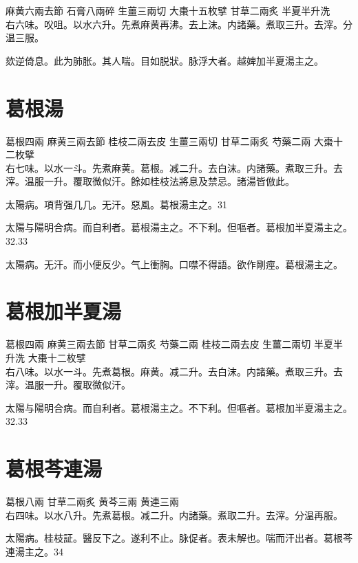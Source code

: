 麻黄{\scriptsize 六兩去節} 石膏{\scriptsize 八兩碎} 生薑{\scriptsize 三兩切} 大棗{\scriptsize 十五枚擘} 甘草{\scriptsize 二兩炙} 半夏{\scriptsize 半升洗}\\
右六味。㕮咀。以水六升。先煮麻黄再沸。去上沫。内諸藥。煮取三升。去滓。分温三服。

欬逆倚息。此为肺胀。其人喘。目如脱狀。脉浮大者。越婢加半夏湯主之。

\section{葛根湯}

葛根{\scriptsize 四兩} 麻黄{\scriptsize 三兩去節} 桂枝{\scriptsize 二兩去皮} 生薑{\scriptsize 三兩切} 甘草{\scriptsize 二兩炙} 芍藥{\scriptsize 二兩} 大棗{\scriptsize 十二枚擘}\\
右七味。以水一斗。先煮麻黄。葛根。减二升。去白沫。内諸藥。煮取三升。去滓。温服一升。覆取微似汗。餘如桂枝法將息及禁忌。諸湯皆倣此。

太陽病。項背强几几。无汗。惡風。葛根湯主之。31

太陽与陽明合病。而自利{\khaai 者}。葛根湯主之。不下利。但嘔者。葛根加半夏湯主之。32.33

太陽病。无汗。而小便反少。气上衝胸。口噤不得語。欲作剛痙。葛根湯主之。

\section{葛根加半夏湯}

葛根{\scriptsize 四兩} 麻黄{\scriptsize 三兩去節} 甘草{\scriptsize 二兩炙} 芍藥{\scriptsize 二兩} 桂枝{\scriptsize 二兩去皮} 生薑{\scriptsize 二兩切} 半夏{\scriptsize 半升洗} 大棗{\scriptsize 十二枚擘}\\
右八味。以水一斗。先煮葛根。麻黄。减二升。去白沫。内諸藥。煮取三升。去滓。温服一升。覆取微似汗。

太陽与陽明合病。而自利{\khaai 者}。葛根湯主之。不下利。但嘔者。葛根加半夏湯主之。32.33

\section{葛根芩連湯}

葛根{\scriptsize 八兩} 甘草{\scriptsize 二兩炙} 黄芩{\scriptsize 三兩} 黄連{\scriptsize 三兩}\\
右四味。以水八升。先煮葛根。减二升。内諸藥。煮取二升。去滓。分温再服。

太陽病。桂枝証。醫反下之。遂利不止。脉促者。表未解也。喘而汗出者。葛根芩連湯主之。34

